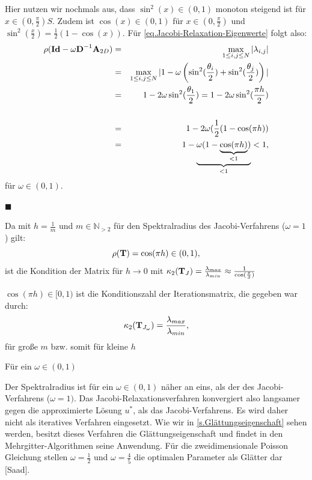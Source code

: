 Hier nutzen wir nochmals aus, dass $\sin^{2}(x) \in (0,1)$ monoton steigend ist für $x \in (0, \frac{\pi}{2})S$. Zudem ist $\cos(x) \in (0,1)$ für $x \in (0,\frac{\pi}{2})$ und $\sin^{2}(\frac{x}{2}) = \frac{1}{2} (1 - \cos(x))$.
Für \autoref{eq.Jacobi-Relaxation-Eigenwerte} folgt also:
\begin{eqnarray}
\rho({\textbf{Id}}-\omega{\textbf{D}}^{-1}{\textbf{A}}_{2D}) &=& \max_{1 \le i,j \le N} | \lambda_{i,j} | \notag \\
&=& \max_{1 \le i,j \le N} | 1 - \omega \left(\sin^{2}(\frac {\theta_{i}} {2}) + \sin^{2}(\frac {\theta_{j}} {2}) \right) | \notag \\
&=& 1 - 2 \omega \sin^{2} (\frac {\theta_{1}} {2}) = 1 - 2 \omega \sin^{2} (\frac {\pi h} {2}) \notag \\ \notag \\
&=& 1 - 2 \omega (\frac{1} {2} (1 - \cos (\pi h)) \notag \\
&=& 1 - \underbrace{\omega(1 - \underbrace{\cos (\pi h)}_{< 1})}_{< 1} < 1, \notag
\end{eqnarray}
für $\omega \in (0,1)$.
\begin{flushright}
$\blacksquare$
\end{flushright}

Da mit $h = \frac{1}{m}$ und $m \in \mathbb{N}_{>2}$ für den Spektralradius des Jacobi-Verfahrens ($\omega = 1$) gilt:
\begin{equation}
  \rho({\textbf{T}}) = \cos(\pi h) \in (0,1),
\end{equation}
ist die Kondition der Matrix für $h \longrightarrow 0$ mit $\kappa_{2}({\textbf{T}}_{J}) = \frac{\lambda_{max}}{\lambda_{min}} \approx \frac{1}{\cos(\frac{\pi}{3})}$

 $\cos(\pi h) \in [0,1)$ ist die Konditionszahl der Iterationsmatrix, die gegeben war durch:
\begin{equation}
  \kappa_{2}({\textbf{T}}_{J_{\omega}}) = \frac{\lambda_{max}}{\lambda_{min}},
\end{equation}
für große $m$ bzw. somit für kleine $h$

Für ein $\omega \in (0,1)$ 

Der Spektralradius ist für ein $\omega \in (0,1)$ näher an eins, als der des Jacobi-Verfahrens ($\omega = 1)$. Das Jacobi-Relaxationsverfahren konvergiert also langsamer gegen die approximierte Lösung $u^{*}$, als das Jacobi-Verfahrens. Es wird daher nicht als iteratives Verfahren eingesetzt. Wie wir in \autoref{s.Glättungseigenschaft} sehen werden, besitzt dieses Verfahren die Glättungseigenschaft und findet in den Mehrgitter-Algorithmen seine Anwendung. Für die zweidimensionale Poisson Gleichung stellen $\omega = \frac{1}{2}$ und $\omega = \frac{4}{5}$ die optimalen Parameter als Glätter dar [Saad].

